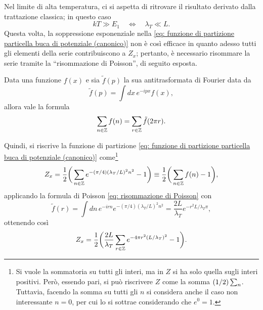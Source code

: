 \begin{caso}
    Nel limite di alta temperatura, ci si aspetta di ritrovare il risultato derivato dalla trattazione classica; in questo caso
    \begin{equation}
        kT \gg E_1 \quad\Longleftrightarrow\quad \lambda_T \ll L.
    \end{equation}
    Questa volta, la soppressione esponenziale nella \eqref{eq: funzione di partizione particella buca di potenziale (canonico)} non è così efficace in quanto adesso tutti gli elementi della serie contribuiscono a $Z_x$; pertanto, è necessario risommare la serie tramite la ``risommazione di Poisson'', di seguito esposta.
    \begin{teo}
        Data una funzione $f(x)$ e sia $\tilde{f}(p)$ la sua antitrasformata di Fourier data da
        \begin{equation}
            \tilde{f}(p) = \int dx\,e^{-ipx}f(x),
        \end{equation}
        allora vale la formula
        \begin{equation}
        \label{eq: risommazione di Poisson}
            \sum_{n\in\mathbb{Z}}f(n) = \sum_{r\in\mathbb{Z}}\tilde{f}(2\pi r).
        \end{equation}
    \end{teo}
    Quindi, si riscrive la funzione di partizione \eqref{eq: funzione di partizione particella buca di potenziale (canonico)} come\footnote{Si vuole la sommatoria su tutti gli interi, ma in $Z$ si ha solo quella sugli interi positivi. Però, essendo pari, si può riscrivere $Z$ come la somma $(1/2)\sum\nolimits_n$. Tuttavia, facendo la somma su tutti gli $n$ si considera anche il caso non interessante $n = 0$, per cui lo si sottrae considerando che $e^0 = 1$.}
    \begin{equation}
        Z_x = \frac{1}{2}\bigg(\sum_{n\in\mathbb{Z}}e^{-(\pi/4)(\lambda_T/L)^2n^2} - 1\bigg) \equiv \frac{1}{2}\bigg(\sum_{n\in\mathbb{Z}}f(n) - 1\bigg),
    \end{equation}
    applicando la formula di Poisson \eqref{eq: risommazione di Poisson} con 
    \begin{equation}
        \tilde{f}(r) = \int dn\,e^{-irn}e^{-(\pi/4)(\lambda_T/L)^2n^2} = \frac{2L}{\lambda_T}e^{-r^2L/\lambda_T\pi},
    \end{equation}
    ottenendo così 
    \begin{equation}
        Z_x = \frac{1}{2}\bigg(\frac{2L}{\lambda_T}\sum_{r\in\mathbb{Z}}e^{-4\pi r^2(L/\lambda_T)^2} - 1\bigg).
    \end{equation}

\end{caso}
